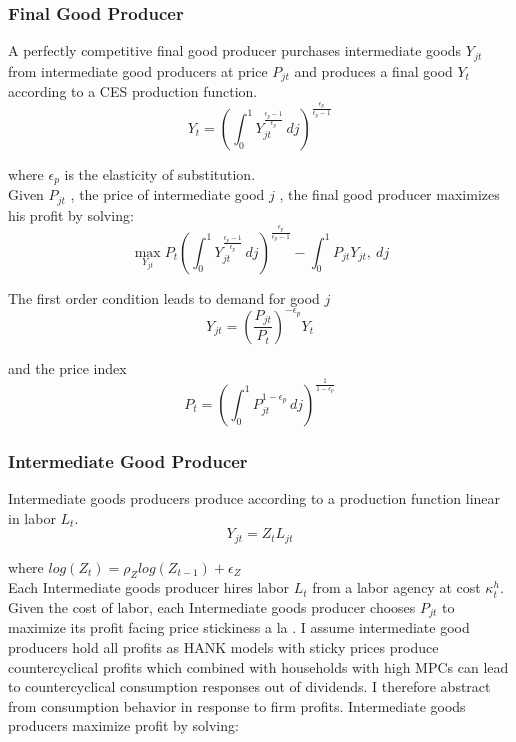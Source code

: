 \hypertarget{Final Good Producer}{}
\subsubsection{Final Good Producer}

A perfectly competitive final good producer purchases intermediate goods $Y_{jt}$ from intermediate good producers at price $P_{jt}$ and produces a final good $Y_{t}$ according to a CES production function. 
$$ Y_{t} = \left(\int_{0}^{1} Y_{jt}^{\frac{\epsilon_{p}-1}{\epsilon_{p}}}\, dj\right)^{\frac{\epsilon_{p}}{\epsilon_{p}-1}}$$ 

where $\epsilon_{p}$ is the elasticity of substitution. \\

Given $P_{jt}$ , the price of intermediate good $j$ ,  the final good producer maximizes his profit by solving:
$$ \max_{Y_{jt}} P_{t} \left(\int_{0}^{1} Y_{jt}^{\frac{\epsilon_{p}-1}{\epsilon_{p}}}\, dj\right)^{\frac{\epsilon_{p}}{\epsilon_{p}-1}} - \int_{0}^{1} P_{jt} Y_{jt} ,\ dj $$ 
\vspace{.2cm}

The first order condition leads to demand for good $j$
$$Y_{jt} = \left(\frac {P_{jt}}{P_{t}}\right)^{- \epsilon_{p}} Y_{t}$$

and the price index
$$P_{t} = \left(\int_{0}^{1} P_{jt}^{1-\epsilon_{p}}\,dj \right )^{\frac{1}{1-\epsilon_{p}}}$$


\hypertarget{Intermediate Good Producer}{}
\subsubsection{Intermediate Good Producer}

Intermediate goods producers produce according to a production function linear in labor $L_{t}$. 
$$Y_{jt} =  Z_{t}  L_{jt}$$ 

where $log(Z_{t}) = \rho_{Z} log( Z_{t-1}) + \epsilon_{Z}$ \\

  
 Each Intermediate goods producer hires labor $L_{t}$ from a labor agency at cost $\kappa^{h}_{t}$. 
 Given the cost of labor, each Intermediate goods producer chooses $P_{jt}$ to maximize its profit facing price stickiness a la \cite{rotemberg1982sticky}. I assume intermediate good producers hold all profits as HANK models with sticky prices produce countercyclical profits which combined with households with high MPCs can lead to countercyclical consumption responses out of dividends. I therefore abstract from consumption behavior in response to firm profits. Intermediate goods producers maximize profit by solving:
 
